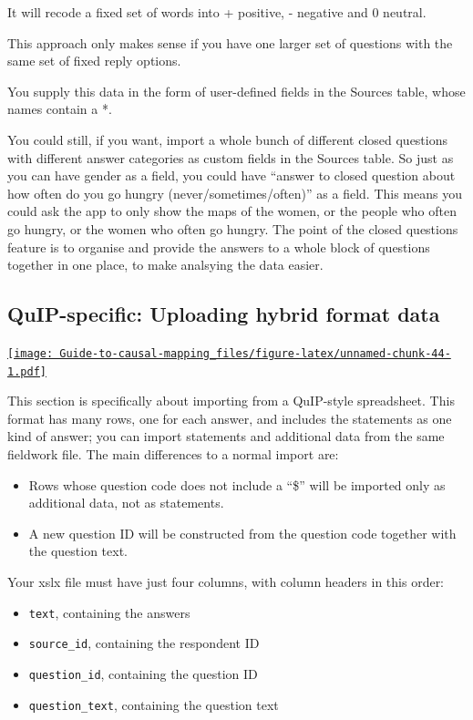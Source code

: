 \documentclass[
]{book}
\providecommand{\tightlist}{%
  \setlength{\itemsep}{0pt}\setlength{\parskip}{0pt}}
\begin{document}
It will recode a fixed set of words into + positive, - negative and 0 neutral.

This approach only makes sense if you have one larger set of questions with the same set of fixed reply options.

You supply this data in the form of user-defined fields in the Sources table, whose names contain a *.

You could still, if you want, import a whole bunch of different closed questions with different answer categories as custom fields in the Sources table. So just as you can have gender as a field, you could have ``answer to closed question about how often do you go hungry (never/sometimes/often)'' as a field. This means you could ask the app to only show the maps of the women, or the people who often go hungry, or the women who often go hungry. The point of the closed questions feature is to organise and provide the answers to a whole block of questions together in one place, to make analsying the data easier.

\hypertarget{ximport-quip}{%
\subsection{QuIP-specific: Uploading hybrid format data}\label{ximport-quip}}

\href{https://player.vimeo.com/video/664879474}{\texttt{[image: Guide-to-causal-mapping\_files/figure-latex/unnamed-chunk-44-1.pdf]}}

This section is specifically about importing from a QuIP-style spreadsheet. This format has many rows, one for each answer, and includes the statements as one kind of answer; you can import statements and additional data from the same fieldwork file. The main differences to a normal import are:

\begin{itemize}
\tightlist
\item
  Rows whose question code does not include a ``\$'' will be imported only as additional data, not as statements.
\item
  A new question ID will be constructed from the question code together with the question text.
\end{itemize}

Your xslx file must have just four columns, with column headers in this order:

\begin{itemize}
\tightlist
\item
  \texttt{text}, containing the answers
\item
  \texttt{source\_id}, containing the respondent ID
\item
  \texttt{question\_id}, containing the question ID
\item
  \texttt{question\_text}, containing the question text
\end{itemize}
\end{document}
